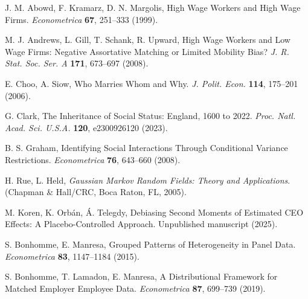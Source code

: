 \documentclass[9pt,twocolumn,twoside]{pnas-new}
\begin{document}
\showmatmethods{}


\showacknow{}

\begin{thebibliography}{9}

J. M. Abowd, F. Kramarz, D. N. Margolis, 
High Wage Workers and High Wage Firms. 
\textit{Econometrica} \textbf{67}, 251--333 (1999).

M. J. Andrews, L. Gill, T. Schank, R. Upward, 
High Wage Workers and Low Wage Firms: Negative Assortative Matching or Limited Mobility Bias? 
\textit{J. R. Stat. Soc. Ser. A} \textbf{171}, 673--697 (2008).

E. Choo, A. Siow, 
Who Marries Whom and Why. 
\textit{J. Polit. Econ.} \textbf{114}, 175--201 (2006).

G. Clark, 
The Inheritance of Social Status: England, 1600 to 2022. 
\textit{Proc. Natl. Acad. Sci. U.S.A.} \textbf{120}, e2300926120 (2023).

B. S. Graham, 
Identifying Social Interactions Through Conditional Variance Restrictions. 
\textit{Econometrica} \textbf{76}, 643--660 (2008).

H. Rue, L. Held, 
\textit{Gaussian Markov Random Fields: Theory and Applications}. 
(Chapman \& Hall/CRC, Boca Raton, FL, 2005).

M. Koren, K. Orbán, Á. Telegdy, 
Debiasing Second Moments of Estimated CEO Effects: A Placebo-Controlled Approach. 
Unpublished manuscript (2025).

S. Bonhomme, E. Manresa, 
Grouped Patterns of Heterogeneity in Panel Data. 
\textit{Econometrica} \textbf{83}, 1147--1184 (2015).

S. Bonhomme, T. Lamadon, E. Manresa, 
A Distributional Framework for Matched Employer Employee Data. 
\textit{Econometrica} \textbf{87}, 699--739 (2019).

\end{thebibliography}
\end{document}
